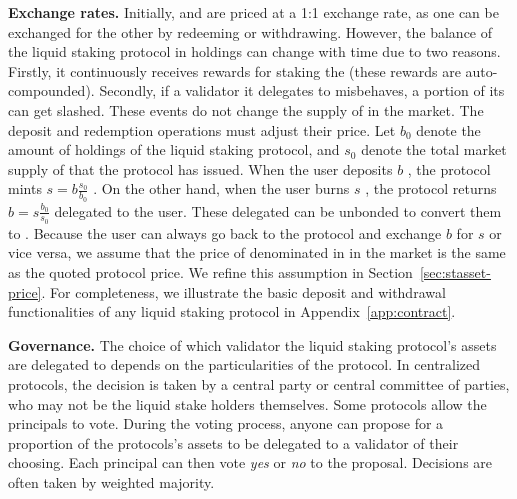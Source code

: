 \noindent
\textbf{Exchange rates.} Initially, \asset and \stasset are priced at a 1:1 exchange rate,
as one can be exchanged for the other by redeeming or withdrawing. However, the balance
of the liquid staking protocol in \asset holdings can change with time due to two reasons.
Firstly, it continuously receives rewards for staking the \asset (these rewards are
auto-compounded). Secondly, if a validator it delegates to misbehaves, a portion of its
\asset can get slashed. These events do not change the supply of \stasset in the market.
The deposit and redemption operations must adjust their price.
Let $b_0$ \asset denote the amount of \asset holdings of the liquid staking
protocol, and $s_0$ \stasset denote the total market supply of \stasset that the protocol
has issued. When the user deposits $b$ \asset, the protocol mints $s = b \frac{s_0}{b_0}$ \stasset.
On the other hand, when the user burns $s$ \asset, the protocol returns $b = s \frac{b_0}{s_0}$
delegated \asset to the user. These delegated \asset can be unbonded to convert them
to \asset. Because the user can always go back to the protocol and exchange $b$ for $s$ or
vice versa, we assume that the price of \stasset denominated in \asset in the
market is the same as the quoted protocol price. We refine this assumption in
Section~\ref{sec:stasset-price}. For completeness, we illustrate the basic deposit and withdrawal
functionalities of any liquid staking protocol in Appendix~\ref{app:contract}.

\noindent
\textbf{Governance.}
The choice of which validator the liquid staking protocol's assets are delegated to
depends on the particularities of the protocol.
In centralized protocols, the decision is taken by a
central party or central committee of parties, who may not be the
liquid stake holders themselves.
Some protocols allow the principals to vote.
During the voting process, anyone can propose for a proportion of the protocols's assets
to be delegated to a validator of their choosing.
Each principal can then vote \emph{yes} or \emph{no}
to the proposal. Decisions are often taken by weighted majority.